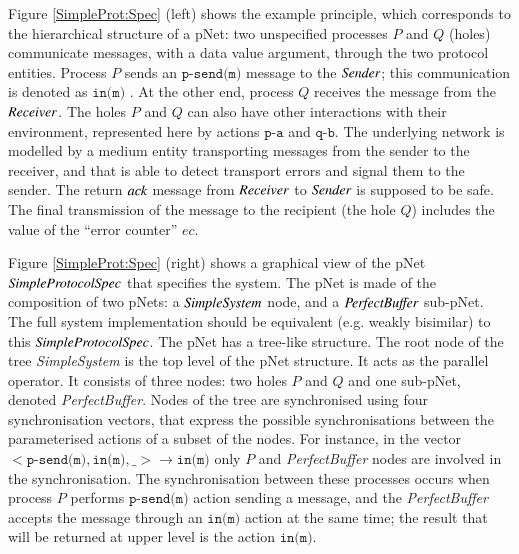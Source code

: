 \documentclass{elsarticle}
\newcommand{\nounderline}[1]{#1}
\begin{document}
Figure \ref{SimpleProt:Spec} (left) shows the example principle, which corresponds to the hierarchical structure of a pNet: two unspecified
processes $P$ and $Q$ (holes) communicate messages, with a data value
argument, through the two protocol entities. Process $P$ sends an $\texttt{p-send(m)}$ message to the $\symb{Sender}$; this communication is denoted as $\texttt{\nounderline{in(m)}}$%
.
At the other end, process $Q$ receives the message from the $\symb{Receiver}$. The holes $P$ and $Q$ can also have other interactions with their environment, represented here by actions $\texttt{p-a}$ and $\texttt{q-b}$. The underlying network is modelled by a medium entity transporting messages from the sender to the receiver, and that is able to detect transport errors and signal them to the sender. The return $\symb{ack}$ message from $\symb{Receiver}$ to $\symb{Sender}$ is supposed to be safe. The final transmission of the message to the recipient (the hole $Q$) includes the value of the ``error counter'' $ec$.


Figure \ref{SimpleProt:Spec} (right) shows a graphical view of the pNet $\symb{SimpleProtocolSpec}$ that specifies the system. The pNet is made of the composition of two pNets: a $\symb{SimpleSystem}$ node, and a $\symb{PerfectBuffer}$ sub-pNet. 
The full system implementation should be equivalent (e.g.  weakly bisimilar)
to this $\symb{SimpleProtocolSpec}$.  
The pNet has a tree-like structure.  The root node of the tree {\it SimpleSystem} is the top level of the pNet structure. It acts as the parallel operator. It consists of three nodes: two holes $P$ and $Q$ and one sub-pNet, denoted {\it PerfectBuffer}. Nodes of the tree are synchronised using four synchronisation vectors, that  express the possible synchronisations between the parameterised actions of a subset of the nodes. For instance, in the vector $< \texttt{p-send(m)},\texttt{in(m)},\_> \rightarrow \texttt{\nounderline{in(m)}}$ only $P$ and {\it PerfectBuffer} nodes are involved in the synchronisation. The synchronisation between these processes occurs when  process $P$  performs $\texttt{p-send(m)}$  action sending a message, and  the {\it PerfectBuffer} accepts the message through an $\texttt{in(m)}$ action  at the same time; the result that will be returned at upper level is the action  $\texttt{\nounderline{in(m)}}$.
\end{document}
